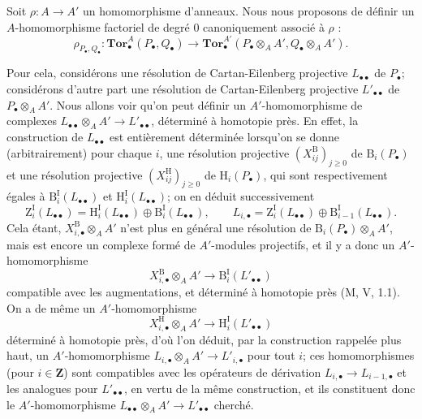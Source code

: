 Soit $\rho:A\to A'$ un homomorphisme d'anneaux. Nous nous proposons de
définir un $A$-homomorphisme factoriel de degré 0 canoniquement associé à
$\rho$ :
\[
  \rho_{P_\bullet,Q_\bullet}:
  \mathbf{Tor}_\bullet^A(P_\bullet,Q_\bullet)
  \longrightarrow
  \mathbf{Tor}_\bullet^{A'}
  (P_\bullet\otimes_A A',Q_\bullet\otimes_A A').
  \tag{6.3.8.1}\label{III.6.3.8.1.fr}
\]

Pour cela, considérons une résolution de Cartan-Eilenberg projective
$L_{\bullet\bullet}$ de $P_\bullet$; considérons d'autre part une résolution
de Cartan-Eilenberg projective $L'_{\bullet\bullet}$ de
$P_\bullet\otimes_A A'$. Nous allons voir qu'on peut définir un
$A'$-homomorphisme de complexes
$L_{\bullet\bullet}\otimes_A A'\to L'_{\bullet\bullet}$, déterminé à
homotopie près. En effet, la construction de $L_{\bullet\bullet}$ est
entièrement déterminée lorsqu'on se donne (arbitrairement) pour chaque $i$,
une résolution projective $(X_{ij}^{\mathrm B})_{j\geqslant0}$ de
$\mathrm B_i(P_\bullet)$ et une résolution projective
$(X_{ij}^{\mathrm H})_{j\geqslant0}$ de $\mathrm H_i(P_\bullet)$, qui sont
respectivement égales à $\mathrm B_i^{\mathrm I}(L_{\bullet\bullet})$ et
$\mathrm H_i^{\mathrm I}(L_{\bullet\bullet})$; on en déduit successivement
\[
  \mathrm Z_i^{\mathrm I}(L_{\bullet\bullet})
  =\mathrm H_i^{\mathrm I}(L_{\bullet\bullet})
   \oplus\mathrm B_i^{\mathrm I}(L_{\bullet\bullet}),
  \qquad
  L_{i,\bullet}=\mathrm Z_i^{\mathrm I}(L_{\bullet\bullet})
   \oplus\mathrm B_{i-1}^{\mathrm I}(L_{\bullet\bullet}).
\]
Cela étant, $X_{i,\bullet}^{\mathrm B}\otimes_A A'$ n'est plus en général
une résolution de $\mathrm B_i(P_\bullet)\otimes_A A'$, mais est encore un
complexe formé de $A'$-modules projectifs, et il y a donc un
$A'$-homomorphisme
\[
  X_{i,\bullet}^{\mathrm B}\otimes_A A'
  \longrightarrow \mathrm B_i^{\mathrm I}(L'_{\bullet\bullet})
\]
compatible avec les augmentations, et déterminé à homotopie près
(M, V, 1.1). On a de même un $A'$-homomorphisme
\[
  X_{i,\bullet}^{\mathrm H}\otimes_A A'
  \longrightarrow \mathrm H_i^{\mathrm I}(L'_{\bullet\bullet})
\]
déterminé à homotopie près, d'où l'on déduit, par la construction rappelée
plus haut, un $A'$-homomorphisme
$L_{i,\bullet}\otimes_A A'\to L'_{i,\bullet}$ pour tout $i$; ces
homomorphismes (pour $i\in\mathbf Z$) sont compatibles avec les opérateurs de
dérivation $L_{i,\bullet}\to L_{i-1,\bullet}$ et les analogues pour
$L'_{\bullet\bullet}$, en vertu de la même construction, et ils constituent
donc le $A'$-homomorphisme
$L_{\bullet\bullet}\otimes_A A'\to L'_{\bullet\bullet}$ cherché.

